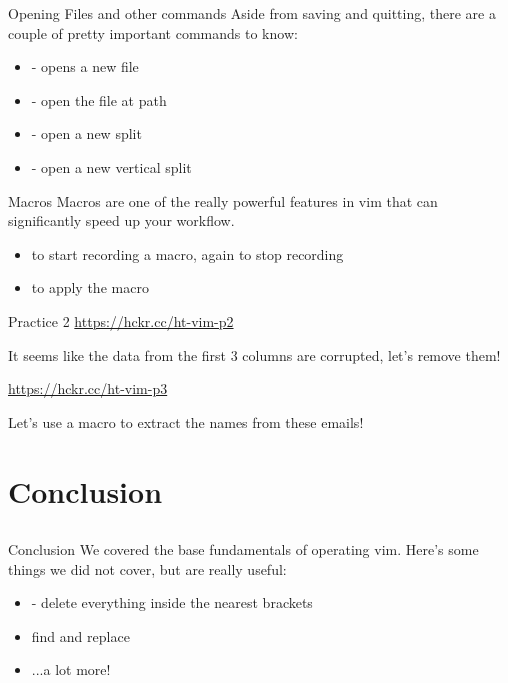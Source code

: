 \documentclass[12pt]{beamer}
\begin{document}
\begin{frame}{Opening Files and other commands}
    Aside from saving and quitting, there are a couple of pretty important commands to know:
    \begin{itemize}
        \item {} - opens a new file
        \item {} - open the file at path
        \item {} - open a new split
        \item {} - open a new vertical split
    \end{itemize}{}
\end{frame}{}

\begin{frame}{Macros}
    Macros are one of the really powerful features in vim that can significantly speed up your workflow.
    \begin{itemize}
        \item {} to start recording a macro,  again to stop recording
        \item {} to apply the macro
    \end{itemize}{}

\end{frame}{}
    
\begin{frame}{Practice 2}
    \url{https://hckr.cc/ht-vim-p2}

    It seems like the data from the first 3 columns are corrupted, let's remove them!

    \url{https://hckr.cc/ht-vim-p3}

    Let's use a macro to extract the names from these emails!
\end{frame}{}

\section{Conclusion}
\subsection{}

\begin{frame}{Conclusion}
    We covered the base fundamentals of operating vim. Here's some things we did not cover, but are really
    useful:
    \begin{itemize}
        \item {} - delete everything inside the nearest brackets
        \item find and replace
        \item ...a lot more!
    \end{itemize}{}
\end{frame}{}
\end{document}
